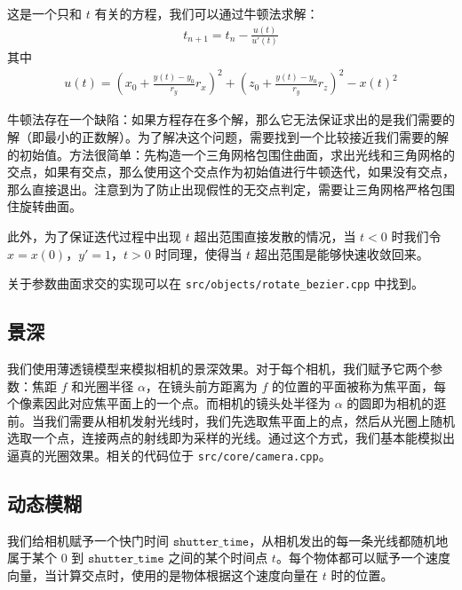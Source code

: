 \documentclass[cn]{report}
\let\t\texttt
\begin{document}
    这是一个只和 $t$ 有关的方程，我们可以通过牛顿法求解： \begin{align}
        t_{n+1} = t_n - \frac{u(t)}{u'(t)}
    \end{align}
    其中 \begin{align}
        u(t) = \left(x_0 + \frac{y(t) - y_0}{r_y} r_x\right)^2
        + \left(z_0 + \frac{y(t) - y_0}{r_y} r_z\right)^2
        - x(t)^2
    \end{align}

    牛顿法存在一个缺陷：如果方程存在多个解，那么它无法保证求出的是我们需要的解（即最小的正数解）。为了解决这个问题，需要找到一个比较接近我们需要的解的初始值。方法很简单：先构造一个三角网格包围住曲面，求出光线和三角网格的交点，如果有交点，那么使用这个交点作为初始值进行牛顿迭代，如果没有交点，那么直接退出。注意到为了防止出现假性的无交点判定，需要让三角网格严格包围住旋转曲面。

    此外，为了保证迭代过程中出现 $t$ 超出范围直接发散的情况，当 $t < 0$ 时我们令 $x = x(0)$，$y' = 1$，$t > 0$ 时同理，使得当 $t$ 超出范围是能够快速收敛回来。

    关于参数曲面求交的实现可以在 \t{src/objects/rotate\_bezier.cpp} 中找到。

    \subsection{景深}

    我们使用薄透镜模型来模拟相机的景深效果。对于每个相机，我们赋予它两个参数：焦距 $f$ 和光圈半径 $\alpha$，在镜头前方距离为 $f$ 的位置的平面被称为焦平面，每个像素因此对应焦平面上的一个点。而相机的镜头处半径为 $\alpha$ 的圆即为相机的逛前。当我们需要从相机发射光线时，我们先选取焦平面上的点，然后从光圈上随机选取一个点，连接两点的射线即为采样的光线。通过这个方式，我们基本能模拟出逼真的光圈效果。相关的代码位于 \t{src/core/camera.cpp}。

    \subsection{动态模糊}

    我们给相机赋予一个快门时间 $\t{shutter\_time}$，从相机发出的每一条光线都随机地属于某个 $0$ 到 $\t{shutter\_time}$ 之间的某个时间点 $t$。每个物体都可以赋予一个速度向量，当计算交点时，使用的是物体根据这个速度向量在 $t$ 时的位置。
\end{document}
